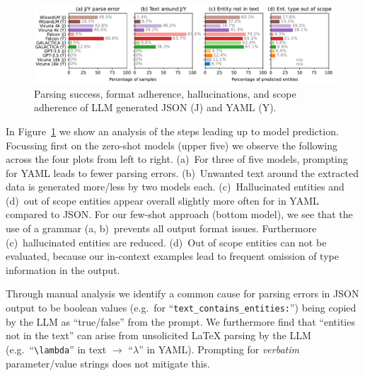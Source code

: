 
\begin{figure}[tb]
  \centering
  \includegraphics[width=\linewidth]{figures/ref_params/format_eval_mix}
  \caption[Parsing success, format adherence, hallucinations, and scope adherence of LLM generated JSON and YAML]{Parsing success, format adherence, hallucinations, and scope adherence of LLM generated JSON (J) and YAML (Y).}
  \label{fig:yamlVSjson}
\end{figure}

In Figure~\ref{fig:yamlVSjson} we show an analysis of the steps leading up to model prediction. Focussing first on the zero-shot models (upper five) we observe the following across the four plots from left to right. (a)~For three of five models, prompting for YAML leads to fewer parsing errors. (b)~Unwanted text around the extracted data is generated more/less by two models each. (c)~Hallucinated entities and (d)~out of scope entities appear overall slightly more often for in YAML compared to JSON. For our few-shot approach (bottom model), we see that the use of a grammar (a, b)~prevents all output format issues. Furthermore (c)~hallucinated entities are reduced. (d)~Out of scope entities can not be evaluated, because our in-context examples lead to frequent omission of type information in the output.

Through manual analysis we identify a common cause for parsing errors in JSON output to be boolean values (e.g.\ for ``\texttt{text\_\allowbreak contains\_\allowbreak entities:}'') being copied by the LLM as ``true/false'' from the prompt. We furthermore find that ``entities not in the text'' can arise from unsolicited \LaTeX{} parsing by the LLM (e.g.\ ``\verb|\lambda|'' in text $\rightarrow$ ``$\lambda$'' in YAML). Prompting for \emph{verbatim} parameter/value strings does not mitigate this.

